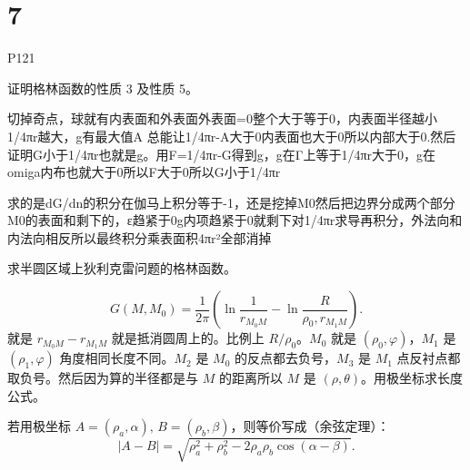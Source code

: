 \section{7}
P121
\begin{homework}[1]
证明格林函数的性质 3 及性质 5。
\end{homework}
\begin{dxtips}[性质3]
    切掉奇点，球就有内表面和外表面外表面=0整个大于等于0，内表面半径越小1/4πr越大，g有最大值A 总能让1/4πr-A大于0内表面也大于0所以内部大于0.然后证明G小于1/4πr也就是g。用F=1/4πr-G得到g，g在Γ上等于1/4πr大于0，g在omiga内布也就大于0所以F大于0所以G小于1/4πr
\end{dxtips}
\begin{dxtips}[性质5]
求的是dG/dn的积分在伽马上积分等于-1，还是挖掉M0然后把边界分成两个部分M0的表面和剩下的，ε趋紧于0g内项趋紧于0就剩下对1/4πr求导再积分，外法向和内法向相反所以最终积分乘表面积4πr²全部消掉
    
\end{dxtips}

\begin{homework}[5]
求半圆区域上狄利克雷问题的格林函数。
\end{homework}
\begin{dxtips}
  $$
G(M,M_0)=\frac{1}{2\pi}\left(\ln\frac{1}{r_{M_0M}}-\ln\frac{R}{\rho_0,r_{M_1M}}\right).
$$
就是 $r_{M_0M}-r_{M_1M}$ 就是抵消圆周上的。比例上 $R/\rho_0$。$M_0$ 就是 $(\rho_0,\varphi)$，$M_1$ 是 $(\rho_1,\varphi)$ 角度相同长度不同。$M_2$ 是 $M_0$ 的反点都去负号，$M_3$ 是 $M_1$ 点反衬点都取负号。然后因为算的半径都是与 $M$ 的距离所以 $M$ 是 $(\rho,\theta)$。用极坐标求长度公式。
\end{dxtips}
\begin{dxtips}
    若用极坐标 \(A=(\rho_a,\alpha),\,B=(\rho_b,\beta)\)，则等价写成（余弦定理）：
\[
|A-B|
=\sqrt{\rho_a^{2}+\rho_b^{2}-2\rho_a\rho_b\cos(\alpha-\beta)}.
\]
\end{dxtips}